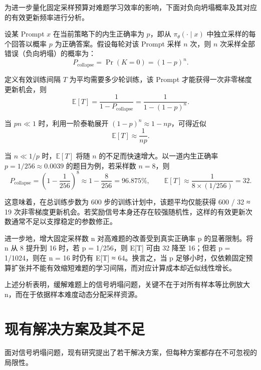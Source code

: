 为进一步量化固定采样预算对难题学习效率的影响，下面对负向坍塌概率及其对应的有效更新频率进行分析。

设某 Prompt $x$ 在当前策略下的内生正确率为 $p$，即从 $\pi_{\theta}(\cdot\mid x)$ 中独立采样的每个回答以概率 $p$ 为正确答案。假设每轮对该 Prompt 采样 $n$ 次，则 $n$ 次采样全部错误（负向坍塌）的概率为：
\begin{equation}
\label{eq:collapse_prob}
P_{\mathrm{collapse}}=\Pr(K=0)=(1-p)^n.
\end{equation}

定义有效训练间隔 $T$ 为平均需要多少轮训练，该 Prompt 才能获得一次非零梯度更新机会，则
\begin{equation}
\label{eq:effective_interval}
\mathbb{E}[T]=\frac{1}{1-P_{\mathrm{collapse}}}=\frac{1}{1-(1-p)^n}.
\end{equation}

当 $pn\ll 1$ 时，利用一阶泰勒展开 $(1-p)^n\approx 1-np$，可得近似
\begin{equation}
\label{eq:effective_interval_approx}
\mathbb{E}[T]\approx \frac{1}{np}.
\end{equation}

当 $n\ll 1/p$ 时，$\mathbb{E}[T]$ 将随 $n$ 的不足而快速增大。以一道内生正确率 $p=1/256\approx 0.0039$ 的题目为例，若采样数 $n=8$，则
\begin{equation}
P_{\mathrm{collapse}}=\left(1-\frac{1}{256}\right)^8\approx 1-\frac{8}{256}=96.875\%,\qquad
\mathbb{E}[T]\approx \frac{1}{8\times (1/256)}=32.
\end{equation}

这意味着，在总训练步数为 600 步的训练计划中，该题平均仅能获得 600 / 32 ≈ 19 次非零梯度更新机会。若奖励信号本身还存在较强随机性，这样的有效更新次数通常不足以支撑稳定的参数修正。

进一步地，增大固定采样数 n 对高难题的改善受到真实正确率 p 的显著限制。将 n 从 8 提升到 16 时，若 p = 1/256，则 E[T] 可由 32 降至 16；但若 p = 1/1024，则在 n = 16 时仍有 E[T] ≈ 64。换言之，当 p 足够小时，仅依赖固定预算扩张并不能有效缩短难题的学习间隔，而对应计算成本却近似线性增长。

上述分析表明，缓解难题上的信号坍塌问题，关键不在于对所有样本等比例放大 n，而在于依据样本难度动态分配采样资源。


\section{现有解决方案及其不足}

面对信号坍塌问题，现有研究提出了若干解决方案，但每种方案都存在不可忽视的局限性。

